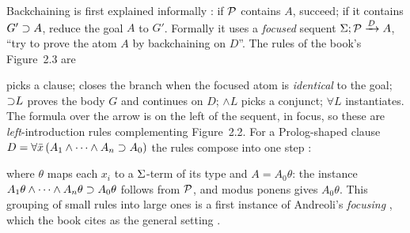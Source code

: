 Backchaining is first explained informally : if $\mathcal{P}$ contains $A$, succeed; if it contains $G'\supset
A$, reduce the goal $A$ to $G'$. Formally it uses a \emph{focused} sequent $\Sigma;\mathcal{P}\xrightarrow{D}A$, ``try
to prove the atom $A$ by backchaining on $D$''. The rules of the book's Figure~2.3  are
 picks a clause;  closes the branch when the focused atom is
\emph{identical} to the goal; ${\supset}L$ proves the body $G$ and continues on $D$; $\wedge L$ picks a
conjunct; $\forall L$ instantiates. The formula over the arrow is on the left of the sequent, in focus, so
these are \emph{left}-introduction rules complementing Figure~2.2. For a Prolog-shaped clause
$D=\forall\bar x\,(A_1\wedge\cdots\wedge A_n\supset A_0)$ the rules compose into one step :
\begin{mathpar}
\end{mathpar}
where $\theta$ maps each $x_i$ to a $\Sigma$-term of its type and $A=A_0\theta$: the instance
$A_1\theta\wedge\cdots\wedge A_n\theta\supset A_0\theta$ follows from $\mathcal{P}$, and modus ponens gives $A_0\theta$.
This grouping of small rules into large ones is a first instance of Andreoli's \emph{focusing}
\cite{Andreoli1992}, which the book cites as the general setting .

